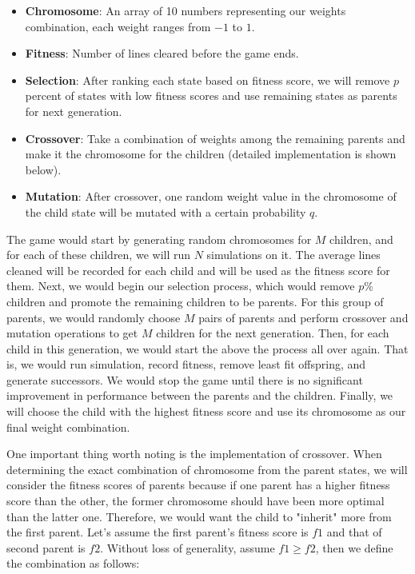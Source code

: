 \documentclass[letterpaper]{article} %
\begin{document}
\begin{itemize}
 \item {\bf Chromosome}: An array of 10 numbers representing our weights combination, each weight ranges from $-1$ to $1$.
 \item {\bf Fitness}: Number of lines cleared before the game ends.
 \item {\bf Selection}: After ranking each state based on fitness score, we will remove $p$ percent of states with low fitness scores and use remaining states as parents for next generation.
 \item {\bf Crossover}: Take a combination of weights among the remaining parents and make it the chromosome for the children (detailed implementation is shown below).
 \item {\bf Mutation}: After crossover, one random weight value in the chromosome of the child state will be mutated with a certain probability $q$.
\end{itemize}


The game would start by generating random chromosomes for $M$ children, and for each of these children, we will run $N$ simulations on it. The average lines cleaned will be recorded for each child and will be used as the fitness score for them. Next, we would begin our selection process, which would remove $p\%$ children and promote the remaining children to be parents. For this group of parents, we would randomly choose $M$ pairs of parents and perform crossover and mutation operations to get $M$ children for the next generation. Then, for each child in this generation, we would start the above the process all over again. That is, we would run simulation, record fitness, remove least fit offspring, and generate successors. We would stop the game until there is no significant improvement in performance between the parents and the children. Finally, we will choose the child with the highest fitness score and use its chromosome as our final weight combination. 

One important thing worth noting is the implementation of crossover. When determining the exact combination of chromosome from the parent states, we will consider the fitness scores of parents because if one parent has a higher fitness score than the other, the former chromosome should have been more optimal than the latter one. Therefore, we would want the child to "inherit" more from the first parent. Let's assume the first parent's fitness score is $f1$ and that of second parent is $f2$. Without loss of generality, assume $f1 \geq f2$, then we define the combination as follows: 
 
\end{document}
